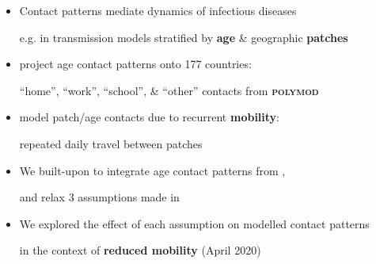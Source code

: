 \begin{itemize}
  \item Contact patterns mediate dynamics of infectious diseases\par
        e.g. in transmission models stratified by \textbf{age} \& geographic \textbf{patches} \cite{Mishra2021}
  \item \citet{Prem2021} project age contact patterns onto 177 countries:\par
        ``home'', ``work'', ``school'', \& ``other'' contacts from \textbf{\textsc{polymod}}
  \item \citet{Arenas2020} model patch/age contacts due to recurrent \textbf{mobility}:\par
        repeated daily travel between patches
  \item We \cite{Knight2021} built-upon \cite{Arenas2020} to integrate age contact patterns from \cite{Prem2021},\par
        and relax 3 assumptions made in \cite{Arenas2020}
  \item We explored the effect of each assumption on modelled contact patterns\par
        in the context of \textbf{reduced mobility} (April 2020)
\end{itemize}
